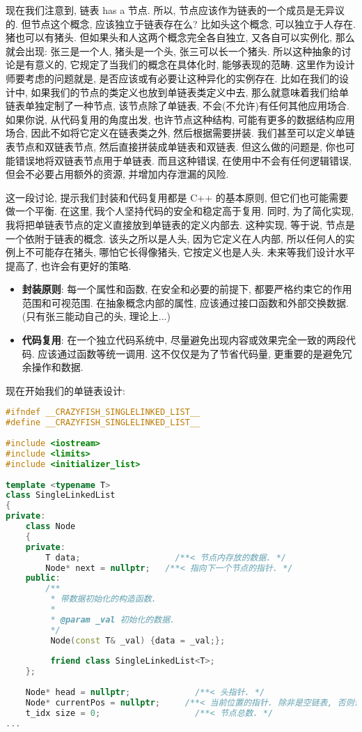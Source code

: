 \documentclass[a4paper]{ctexart}
\theoremstyle{definition}
\theoremstyle{definition}
\begin{document}
现在我们注意到, 链表 has a 节点. 所以, 节点应该作为链表的一个成员是无异议的. 
但节点这个概念, 应该独立于链表存在么? 比如头这个概念, 可以独立于人存在. 
猪也可以有猪头. 但如果头和人这两个概念完全各自独立, 又各自可以实例化, 
那么就会出现: 张三是一个人, 猪头是一个头, 张三可以长一个猪头.
所以这种抽象的讨论是有意义的, 它规定了当我们的概念在具体化时, 能够表现的范畴. 
这里作为设计师要考虑的问题就是, 是否应该或有必要让这种异化的实例存在. 
比如在我们的设计中, 如果我们的节点的类定义也放到单链表类定义中去, 
那么就意味着我们给单链表单独定制了一种节点, 该节点除了单链表, 不会(不允许)有任何其他应用场合. 
如果你说, 从代码复用的角度出发, 也许节点这种结构, 可能有更多的数据结构应用场合, 
因此不如将它定义在链表类之外, 然后根据需要拼装. 我们甚至可以定义单链表节点和双链表节点, 
然后直接拼装成单链表和双链表. 但这么做的问题是, 你也可能错误地将双链表节点用于单链表.
而且这种错误, 在使用中不会有任何逻辑错误, 但会不必要占用额外的资源, 
并增加内存泄漏的风险. 

这一段讨论, 提示我们封装和代码复用都是 C++ 的基本原则, 但它们也可能需要做一个平衡. 
在这里, 我个人坚持代码的安全和稳定高于复用. 同时, 为了简化实现, 
我将把单链表节点的定义直接放到单链表的定义内部去. 这种实现, 等于说, 
节点是一个依附于链表的概念. 该头之所以是人头, 因为它定义在人内部, 
所以任何人的实例上不可能存在猪头, 哪怕它长得像猪头, 它按定义也是人头. 
未来等我们设计水平提高了, 也许会有更好的策略.

\begin{itemize}
  \item {\bf 封装原则}: 每一个属性和函数, 在安全和必要的前提下, 都要严格约束它的作用范围和可视范围. 
  在抽象概念内部的属性, 应该通过接口函数和外部交换数据. (只有张三能动自己的头, 理论上...)
  \item {\bf 代码复用}: 在一个独立代码系统中, 尽量避免出现内容或效果完全一致的两段代码. 
  应该通过函数等统一调用. 这不仅仅是为了节省代码量, 更重要的是避免冗余操作和数据. 
\end{itemize}

现在开始我们的单链表设计:

\begin{lstlisting}[language=c++]
#ifndef __CRAZYFISH_SINGLELINKED_LIST__
#define __CRAZYFISH_SINGLELINKED_LIST__
  
#include <iostream>
#include <limits>
#include <initializer_list>
  
template <typename T>
class SingleLinkedList
{
private:
    class Node
    {
    private:
        T data;			          /**< 节点内存放的数据. */
        Node* next = nullptr;	/**< 指向下一个节点的指针. */
    public:
        /** 
         * 带数据初始化的构造函数.
         * 
         * @param _val 初始化的数据.
         */
         Node(const T& _val) {data = _val;};
  
         friend class SingleLinkedList<T>;
    };
  
    Node* head = nullptr;	          /**< 头指针. */
    Node* currentPos = nullptr;	    /**< 当前位置的指针. 除非是空链表, 否则该指针不能空. */
    t_idx size = 0;		              /**< 节点总数. */
...    
\end{lstlisting}
\end{document}
